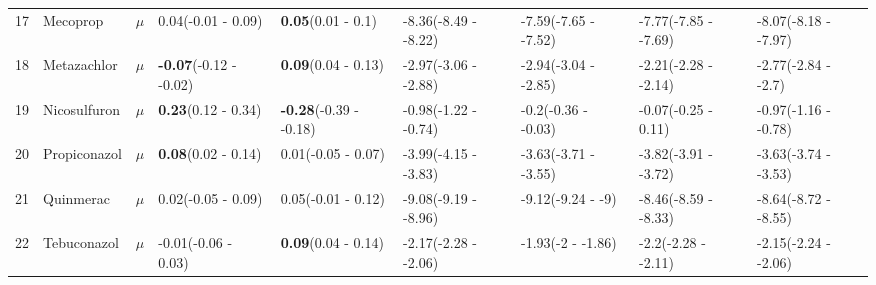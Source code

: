 \begin{longtable}{lp{2cm}p{0.6cm}p{1.8cm}p{1.8cm}p{1.8cm}p{1.8cm}p{1.8cm}p{1.8cm}}
  17 & Mecoprop & $\mu$ & 0.04\newline (-0.01 - 0.09) & \textbf{0.05}\newline (0.01 - 0.1) & -8.36\newline (-8.49 - -8.22) & -7.59\newline (-7.65 - -7.52) & -7.77\newline (-7.85 - -7.69) & -8.07\newline (-8.18 - -7.97) \\ 
  18 & Metazachlor & $\mu$ & \textbf{-0.07}\newline (-0.12 - -0.02) & \textbf{0.09}\newline (0.04 - 0.13) & -2.97\newline (-3.06 - -2.88) & -2.94\newline (-3.04 - -2.85) & -2.21\newline (-2.28 - -2.14) & -2.77\newline (-2.84 - -2.7) \\ 
  19 & Nicosulfuron & $\mu$ & \textbf{0.23}\newline (0.12 - 0.34) & \textbf{-0.28}\newline (-0.39 - -0.18) & -0.98\newline (-1.22 - -0.74) & -0.2\newline (-0.36 - -0.03) & -0.07\newline (-0.25 - 0.11) & -0.97\newline (-1.16 - -0.78) \\ 
  20 & Propiconazol & $\mu$ & \textbf{0.08}\newline (0.02 - 0.14) & 0.01\newline (-0.05 - 0.07) & -3.99\newline (-4.15 - -3.83) & -3.63\newline (-3.71 - -3.55) & -3.82\newline (-3.91 - -3.72) & -3.63\newline (-3.74 - -3.53) \\ 
  21 & Quinmerac & $\mu$ & 0.02\newline (-0.05 - 0.09) & 0.05\newline (-0.01 - 0.12) & -9.08\newline (-9.19 - -8.96) & -9.12\newline (-9.24 - -9) & -8.46\newline (-8.59 - -8.33) & -8.64\newline (-8.72 - -8.55) \\ 
  22 & Tebuconazol & $\mu$ & -0.01\newline (-0.06 - 0.03) & \textbf{0.09}\newline (0.04 - 0.14) & -2.17\newline (-2.28 - -2.06) & -1.93\newline (-2 - -1.86) & -2.2\newline (-2.28 - -2.11) & -2.15\newline (-2.24 - -2.06) \\ 

\end{longtable}
